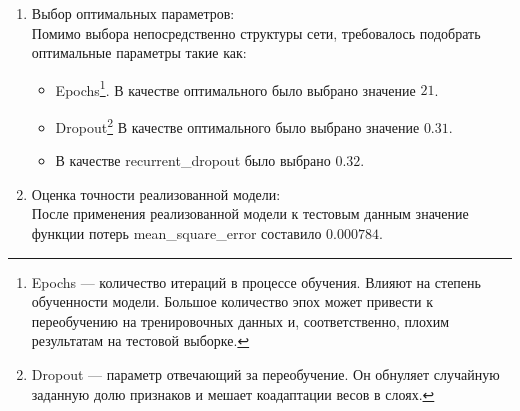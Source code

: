 \documentclass[russian,english,18pt,a4paper,reqno,dviphfm]{article}
\begin{document}
\begin{enumerate}
\begin{itemize}
	    \item[] keras.layers.LSTM(60, dropout=0.31, recurrent\_dropout=0.32)
	    \item[] keras.layers.Dense(1)
	\end{itemize}
	В качестве функции потерь (loss) была выбрана среднеквадратическая ошибка, в качестве оптимизатора (optimizer) был выбран  adam, поскольку они оказались наиболее подходящими для решения поставленной задачи.
	\item Выбор оптимальных параметров: \\
	Помимо выбора непосредственно структуры сети, требовалось подобрать оптимальные параметры такие как:
	\begin{itemize} 
		\item Epochs\footnote{Epochs --- количество итераций в процессе обучения. Влияют на степень обученности модели. Большое количество эпох может привести к переобучению на тренировочных данных и, соответственно, плохим результатам на тестовой выборке.}. В качестве оптимального было выбрано значение $21$.
		\item Dropout\footnote{Dropout --- параметр отвечающий за переобучение. Он обнуляет случайную заданную долю признаков и мешает коадаптации весов в слоях.} В качестве оптимального было выбрано значение $0.31$.
		\item В качестве recurrent\_dropout было выбрано $0.32$.
	\end{itemize}
	\item Оценка точности реализованной модели: \\
	После применения реализованной модели к тестовым данным значение функции потерь mean\_square\_error составило $0.000784$.
\end{enumerate}

\newpage
\end{document}

